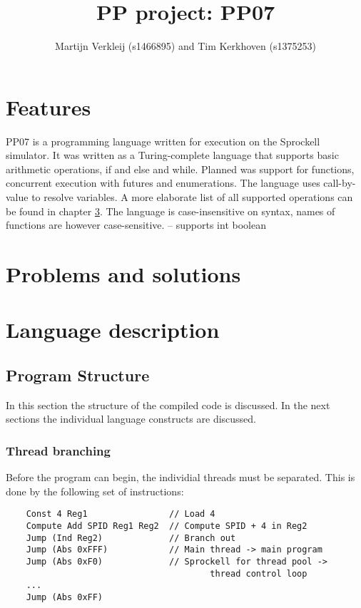 \documentclass[10pt,a4paper]{report}
\author{Martijn Verkleij (s1466895) and Tim Kerkhoven (s1375253)}
\title{PP project: PP07}
\begin{document}
\maketitle
\tableofcontents


\chapter{Features}
PP07 is a programming language written for execution on the Sprockell simulator. It was written as a Turing-complete language that supports basic arithmetic operations, if and else and while. Planned was support for functions, concurrent execution with futures and enumerations. The language uses call-by-value to resolve variables. A more elaborate list of all supported operations can be found in chapter \ref{chp:langdesc}. The language is case-insensitive on syntax, names of functions are however case-sensitive. -- supports int boolean 

\chapter{Problems and solutions}



\chapter{Language description} \label{chp:langdesc}

\section{Program Structure} \label{sec:structure}
In this section the structure of the compiled code is discussed. In the next sections the individual language constructs are discussed. 
\subsection{Thread branching}
Before the program can begin, the individial threads must be separated. This is done by the following set of instructions:
\begin{lstlisting}
	Const 4 Reg1				// Load 4
	Compute Add SPID Reg1 Reg2	// Compute SPID + 4 in Reg2
	Jump (Ind Reg2)				// Branch out
	Jump (Abs 0xFFF)			// Main thread -> main program
	Jump (Abs 0xF0)				// Sprockell for thread pool -> 
										thread control loop
	...
	Jump (Abs 0xFF)
\end{lstlisting}
\end{document}
